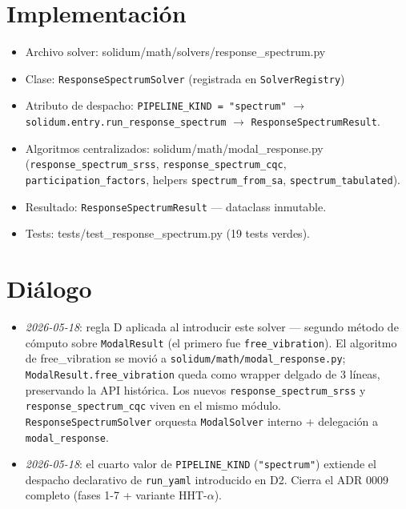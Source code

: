 \documentclass[11pt,letterpaper,oneside]{report}
\begin{document}
\section{Implementación}

\begin{itemize}
  \item Archivo solver: solidum/math/solvers/response\_spectrum.py
  \item Clase: \texttt{ResponseSpectrumSolver} (registrada en \texttt{SolverRegistry})
  \item Atributo de despacho: \texttt{PIPELINE\_KIND = "spectrum"} \ensuremath{\to} \texttt{solidum.entry.run\_response\_spectrum} \ensuremath{\to} \texttt{ResponseSpectrumResult}.
  \item Algoritmos centralizados: solidum/math/modal\_response.py (\texttt{response\_spectrum\_srss}, \texttt{response\_spectrum\_cqc}, \texttt{participation\_factors}, helpers \texttt{spectrum\_from\_sa}, \texttt{spectrum\_tabulated}).
  \item Resultado: \texttt{ResponseSpectrumResult} --- dataclass inmutable.
  \item Tests: tests/test\_response\_spectrum.py (19 tests verdes).
\end{itemize}


\section{Diálogo}

\begin{itemize}
  \item \textit{2026-05-18}: regla D aplicada al introducir este solver --- segundo método de cómputo sobre \texttt{ModalResult} (el primero fue \texttt{free\_vibration}). El algoritmo de free\_vibration se movió a \texttt{solidum/math/modal\_response.py}; \texttt{ModalResult.free\_vibration} queda como wrapper delgado de 3 líneas, preservando la API histórica. Los nuevos \texttt{response\_spectrum\_srss} y \texttt{response\_spectrum\_cqc} viven en el mismo módulo. \texttt{ResponseSpectrumSolver} orquesta \texttt{ModalSolver} interno + delegación a \texttt{modal\_response}.
  \item \textit{2026-05-18}: el cuarto valor de \texttt{PIPELINE\_KIND} (\texttt{"spectrum"}) extiende el despacho declarativo de \texttt{run\_yaml} introducido en D2. Cierra el ADR 0009 completo (fases 1-7 + variante HHT-\ensuremath{\alpha}).
\end{itemize}
\end{document}
